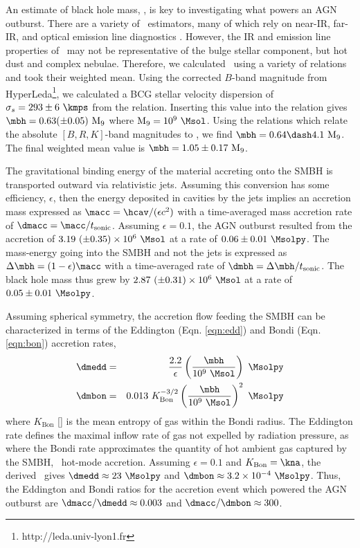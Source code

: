 \documentclass[useAMS,usenatbib]{mn2e}
\begin{document}
An estimate of black hole mass, \mbh, is key to investigating what
powers an AGN outburst. There are a variety of \mbh\ estimators, many
of which rely on near-IR, far-IR, and optical emission line
diagnostics \citep{marconihunt03, 2007MNRAS.379..711G,
  2008ApJ...673..703M}. However, the IR and emission line properties
of \irs\ may not be representative of the bulge stellar component, but
hot dust and complex nebulae. Therefore, we calculated \mbh\ using a
variety of relations and took their weighted mean. Using the corrected
$B$-band magnitude from HyperLeda\footnote{http://leda.univ-lyon1.fr},
we calculated a BCG stellar velocity dispersion of $\sigma_s = 293 \pm
6 ~\kmps$ from the \citet{1976ApJ...204..668F} relation. Inserting
this value into the \citet{2002ApJ...574..740T} relation gives $\mbh =
0.63 (\pm 0.05) ~\mnine$ where $\mnine = 10^9 ~\Msol$. Using the
\citet{2007MNRAS.379..711G} relations which relate the absolute
$[B,R,K]$-band magnitudes to \mbh, we find $\mbh = 0.64 \dash 4.1
~\mnine$. The final weighted mean value is $\mbh = 1.05 \pm
0.17 ~\mnine$.

The gravitational binding energy of the material accreting onto the
SMBH is transported outward via relativistic jets. Assuming this
conversion has some efficiency, $\epsilon$, then the energy deposited
in cavities by the jets implies an accretion mass expressed as $\macc
= \hcav/(\epsilon c^2)$ with a time-averaged mass accretion rate of
$\dmacc = \macc/t_{\mathrm{sonic}}$. Assuming $\epsilon = 0.1$, the
AGN outburst resulted from the accretion of $3.19 ~(\pm 0.35) \times
10^{6} ~\Msol$ at a rate of $0.06 \pm 0.01 ~\Msolpy$. The mass-energy
going into the SMBH and not the jets is expressed as $\Delta \mbh =
(1-\epsilon) \macc$ with a time-averaged rate of $\dmbh = \Delta
\mbh/t_{\mathrm{sonic}}$. The black hole mass thus grew by $2.87 ~(\pm
0.31) \times 10^{6} ~\Msol$ at a rate of $0.05 \pm 0.01 ~\Msolpy$.

Assuming spherical symmetry, the accretion flow feeding the SMBH can
be characterized in terms of the Eddington (Eqn. \ref{eqn:edd}) and
Bondi (Eqn. \ref{eqn:bon}) accretion rates,
\begin{eqnarray}
  \dmedd &=& \frac{2.2}{\epsilon} \left(\frac{\mbh}{10^9~\Msol}\right)
  ~\Msolpy  \label{eqn:edd}\\
  \dmbon &=& 0.013 ~K_{\mathrm{Bon}}^{-3/2} \left(\frac{\mbh}{10^9
    ~\Msol}\right)^{2} ~\Msolpy \label{eqn:bon}
\end{eqnarray}
where $K_{\mathrm{Bon}}$ [\ent] is the mean entropy of gas within the
Bondi radius. The Eddington rate defines the maximal inflow rate of
gas not expelled by radiation pressure, as where the Bondi rate
approximates the quantity of hot ambient gas captured by the SMBH,
\ie\ hot-mode accretion. Assuming $\epsilon = 0.1$ and
$K_{\mathrm{Bon}} = \kna$, the derived \mbh\ gives $\dmedd \approx 23
~\Msolpy$ and $\dmbon \approx 3.2 \times 10^{-4} ~\Msolpy$. Thus, the
Eddington and Bondi ratios for the accretion event which powered the
AGN outburst are $\dmacc/\dmedd \approx 0.003$ and $\dmacc/\dmbon
\approx 300$.
\end{document}
